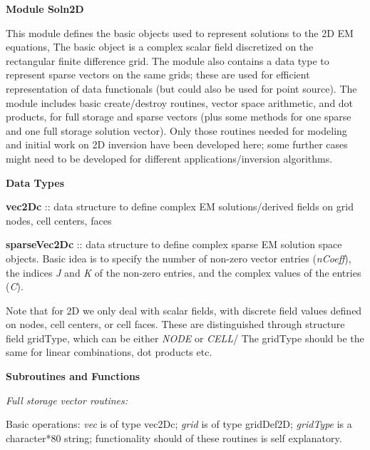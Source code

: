\documentclass[12pt]{article}
\begin{document}
\vspace{10pt}

\noindent
{\bf Module Soln2D}

This module defines the basic objects used to represent solutions to
the 2D EM equations, The basic object is a complex scalar field
discretized on the rectangular finite difference grid.  The module 
also contains a data type to represent sparse vectors on the same grids;
these are used for efficient representation of data functionals
(but could also be used for point source).
The module includes basic create/destroy routines, vector 
space arithmetic, and dot products, for full storage and sparse
vectors (plus some methods for one sparse and one
full storage solution vector).
Only those routines needed for modeling and initial work on 2D
inversion have been developed here; some further cases might
need to be developed for different applications/inversion
algorithms. 

\vspace{10pt}

\noindent
{\bf Data Types}

\vspace{6pt}

\noindent
{\bf vec2Dc} :: data structure to define complex
EM solutions/derived fields on grid nodes,
cell centers, faces

\noindent
{\bf sparseVec2Dc}  :: data structure to define complex
sparse EM solution space objects.  Basic idea is
to specify the number of non-zero vector entries ({\it nCoeff}), the
indices {\it J} and {\it K} of the non-zero entries, and the
complex values of the entries ({\it C}).

Note that for 2D we only deal with scalar fields, with
discrete field values defined on nodes, cell centers,
or cell faces.  These are distinguished through
structure field gridType, which can be either {\it NODE} or 
{\it CELL}/
The gridType should be the same for linear combinations,
dot products etc.

\vspace{10pt}

\noindent
{\bf Subroutines and Functions}

\vspace{6pt}

\noindent
{\it Full storage vector routines:} 

Basic operations:
{\it vec} is of type vec2Dc; {\it grid} is of type
gridDef2D; {\it gridType} is a character*80 string;
functionality should of these routines is self explanatory.
\end{document}
